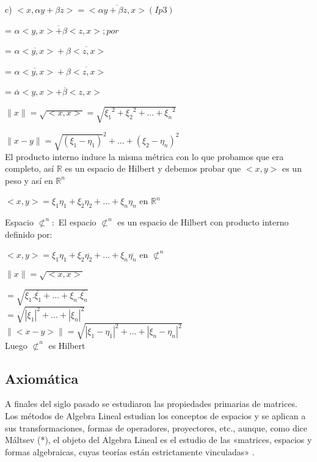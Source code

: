 c) $<x, \alpha y + \beta z> = <\overline{\alpha y +\beta z, x}>  (Ip3)$

{\setlength{\parindent}{1.27in}= $\overline{ \alpha< y, x> + \beta<z, x>}; por$}

{\setlength{\parindent}{1.27in}= $\overline{ \alpha< y, x>}+ \overline{\beta<z, x>}$}

{\setlength{\parindent}{1.27in}= $\overline{ \alpha< y, x>}+ \overline{\beta<z, x>}$}

{\setlength{\parindent}{1.27in}= $\overline{ \alpha}< y, x>+ \overline{\beta}<z, x>$}

$\parallel x \parallel = \sqrt{<x, x>} = \sqrt{ {\xi_{1}}^{2}+{\xi_{2}}^{2}+...+{\xi_{n}}^{2} }$ 

$\parallel x-y \parallel = \sqrt{(\xi_{1}-\eta_{1})}^{2}+...+{(\xi_{2}-\eta_{n})}^{2}$\\

El producto interno induce la misma métrica con lo que probamos que era completo, así  $\mathbb{R}$ es un espacio de Hilbert y debemos probar que $<x, y>$ es un peso y así en $\mathbb{R}^{n}$
\begin{center}
	$ <x, y> = \xi_{1} \eta_{1}+\xi_{2} \eta_{2}+...+\xi_{n} \eta_{n} $ en $ \mathbb{R}^{n} $
\end{center} 

Espacio $\not \subset^{n}:$ El espacio $\not \subset^{n}$ es un espacio de Hilbert con producto interno definido por:
\begin{center}
	$ <x, y> = \xi_{1} \eta_{1}+\xi_{2} \overline{\eta_{2}}+...+\xi_{n} \overline{\eta_{n}} $ en $ \not \subset^{n} $
	
$\parallel x \parallel = \sqrt{<x, x>}$

$= \sqrt{\xi_{1}.\overline{\xi_{1}}+...+{\xi_{n}.\overline{\xi_{n}}} }$\\

$ = \sqrt{|\xi_{1}|^{2}+...+|\xi_{n}|^{2}}$\\

$\parallel <x - y> \parallel = \sqrt{|\xi_{1}-\eta_{1}|^{2}+...+|\xi_{n}-\eta_{n}|^{2}}$\\

Luego $\not \subset^{n}$ es Hilbert
\end{center} 

\subsection{Axiomática}

A finales del siglo pasado se estudiaron las propiedades primarias de matrices. Los
métodos de Algebra Lineal estudian los conceptos de espacios y se aplican a sus
transformaciones, formas de operadores, proyectores, etc., aunque, como dice Máltsev (*), el objeto del Algebra Lineal es el estudio de las «matrices, espacios y formas algebraicas, cuyas teorías están estrictamente vinculadas» .
\\

